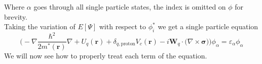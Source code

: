 Where $\alpha$ goes through all single particle states, the index is omitted on $\phi$ for brevity.
\\Taking the variation of $E[\Psi]$ with respect to $\phi_i^*$ we get a single particle equation
\begin{equation}
   \bigg(-\nabla \frac{\hbar^2}{2m^*(\mathbf r)} \nabla + U_q(\mathbf r)+\delta_{q, \text{proton}}V_c(\mathbf r)-  i \mathbf W_q \cdot (\nabla \times \boldsymbol{\sigma)} \bigg)\phi_\alpha = \varepsilon_\alpha\phi_\alpha 
\end{equation}
We will now see how to properly treat each term of the equation.


%


